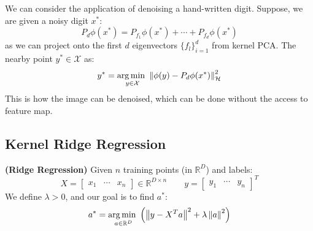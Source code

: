 \begin{remark}
    We can consider the application of denoising a hand-written digit. Suppose, we are given a noisy digit $x^*$:
    \begin{equation*}
        P_d\phi(x^*) = P_{f_1}\phi(x^*) + \cdots + P_{f_d}\phi(x^*)
    \end{equation*}
    as we can project onto the first $d$ eigenvectors $\{f_l\}^d_{i=1}$ from kernel PCA. The nearby point $y^*\in\mathcal{X}$ as:
    \begin{equation*}
        y^* = \underset{y\in\mathcal{X}}{\arg\min \ }\left\lVert\phi(y) - P_d\phi(x^*)\right\rVert^2_{\mathcal{H}}
    \end{equation*}
    This is how the image can be denoised, which can be done without the access to feature map. 
\end{remark}

\subsection{Kernel Ridge Regression}

\begin{definition}{\textbf{(Ridge Regression)}}
    Given $n$ training points (in $\mathbb{R}^D$) and labels:
    \begin{equation*}
        X = \begin{bmatrix}
            x_1 & \cdots & x_n
        \end{bmatrix} \in \mathbb{R}^{D\times n} \qquad y = \begin{bmatrix}
            y_1 & \cdots & y_n
        \end{bmatrix}^T
    \end{equation*}
    We define $\lambda > 0$, and our goal is to find $a^*$:
    \begin{equation*}
        a^* = \underset{a\in \mathbb{R}^D}{\arg\min \ } \left( \left\lVert y - X^Ta\right\rVert^2 + \lambda\left\lVert a\right\rVert^2 \right)
    \end{equation*}
\end{definition}

